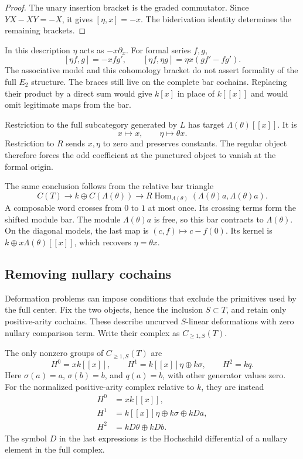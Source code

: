 \begin{proof}
The unary insertion bracket is the graded
commutator. Since $YX-XY=-X$, it gives
$[\eta,x]=-x$. The biderivation identity determines
the remaining brackets.
\end{proof}

In this description $\eta$ acts as $-x\partial_x$.
For formal series $f,g$,
\[
 [\eta f,g]=-xfg',\qquad
 [\eta f,\eta g]=\eta x(gf'-fg').
\]
The associative model and this cohomology bracket
do not assert formality of the full $E_2$ structure.
The braces still live on the complete bar cochains.
Replacing their product by a direct sum would give
$k[x]$ in place of $k[[x]]$ and would omit legitimate
maps from the bar.

Restriction to the full subcategory generated by
$L$ has target $\Lambda(\theta)[[x]]$. It is
\[
 x\longmapsto x,\qquad \eta\longmapsto\theta x.
\]
Restriction to $R$ sends $x,\eta$ to zero and
preserves constants. The regular object therefore
forces the odd coefficient at the punctured object
to vanish at the formal origin.

The same conclusion follows from the relative
bar triangle
\[
 C(T)\longrightarrow k\oplus C(\Lambda(\theta))
 \longrightarrow R\operatorname{Hom}_{\Lambda(\theta)}
          (\Lambda(\theta)a,\Lambda(\theta)a).
\]
A composable word crosses from $0$ to $1$ at most
once. Its crossing terms form the shifted module
bar. The module $\Lambda(\theta)a$ is free, so this
bar contracts to $\Lambda(\theta)$. On the diagonal
models, the last map is $(c,f)\mapsto c-f(0)$.
Its kernel is $k\oplus x\Lambda(\theta)[[x]]$,
which recovers $\eta=\theta x$.

\subsection{Removing nullary cochains}
\label{v4-arith:centers:subsec:nullary}

Deformation problems can impose conditions that exclude
the primitives used by the full center. Fix the two
objects, hence the inclusion $S\subset T$, and retain
only positive-arity cochains. These describe uncurved
$S$-linear deformations with zero nullary comparison
term. Write their complex as $C_{\geq1,S}(T)$.

\begin{proposition}\label{v4-arith:centers:prop:normal-positive}
The only nonzero groups of $C_{\geq1,S}(T)$ are
\[
 H^0=xk[[x]],\qquad
 H^1=k[[x]]\eta\oplus k\sigma,\qquad H^2=kq.
\]
Here $\sigma(a)=a$, $\sigma(b)=b$, and $q(a)=b$,
with other generator values zero.
For the normalized positive-arity complex relative
to $k$, they are instead
\[
\begin{split}
 H^0&=xk[[x]],\\
 H^1&=k[[x]]\eta\oplus k\sigma\oplus kDa,\\
 H^2&=kD\theta\oplus kDb.
\end{split}
\]
The symbol $D$ in the last expressions is the
Hochschild differential of a nullary element in
the full complex.
\end{proposition}

